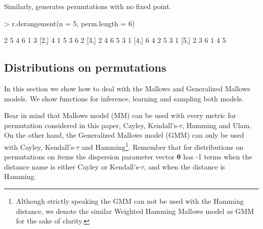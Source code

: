 \documentclass[article,nojss]{jss}
\begin{document}
Similarly,  generates  permutations with no fixed point. 
\begin{Schunk}
\begin{Sinput}
> r.derangement(n = 5, perm.length = 6)
\end{Sinput}
\begin{Soutput}
     [,1] [,2] [,3] [,4] [,5] [,6]
[1,]    2    5    4    6    1    3
[2,]    4    1    5    3    6    2
[3,]    2    4    6    5    3    1
[4,]    6    4    2    5    3    1
[5,]    2    3    6    1    4    5
\end{Soutput}
\end{Schunk}
\subsection{Distributions on permutations}
In this section we show how to deal with the Mallows and Generalized Mallows models. We show functions for inference, learning and sampling both models.

Bear in mind that Mallows model (MM) can be used with every metric for permutation considered in this paper, Cayley, Kendall's-$\tau$, Hamming and Ulam. On the other hand, the Generalized Mallows model (GMM) can only be used with Cayley, Kendall's-$\tau$ and Hamming\footnote{Although strictly speaking the GMM can not be used with the Hamming distance, we denote the similar Weighted Hamming Mallows model as GMM for the sake of clarity.}. Remember that for distributions on permutations on  items the dispersion parameter vector $\boldsymbol \theta$ has -1 terms when the distance name is either Cayley or Kendall's-$\tau$, and  when the distance is Hamming.
\end{document}
